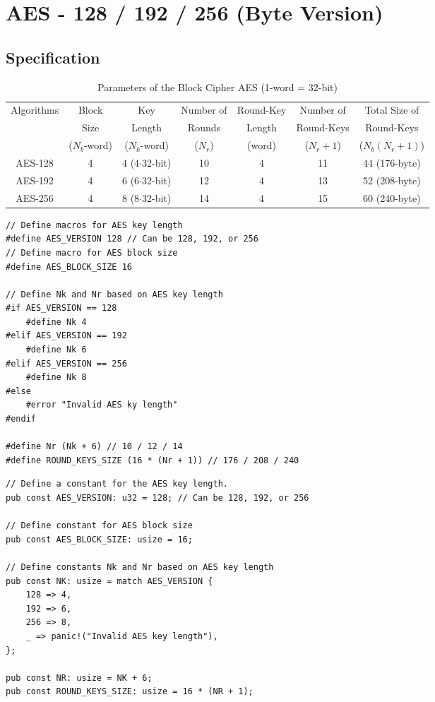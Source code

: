 \chapter{AES - 128 / 192 / 256 (Byte Version)}

\section{Specification}

\begin{table}[h!]\centering\renewcommand{\arraystretch}{1.25} %
	\caption{Parameters of the Block Cipher AES (1-word = 32-bit)}
	\begin{tabular*}{\textwidth}{@{\extracolsep{\fill}}c||cccccc}
		\toprule[1.2pt]
		\multirow{3}{*}{Algorithms} & Block & Key & Number of & Round-Key & Number of & Total Size of\\
		& Size & Length & Rounds &  Length & Round-Keys & Round-Keys \\
		& ($N_b$-word) & ($N_k$-word) & ($N_r$)& (word) & ($N_r+1$)& ($N_b(N_r+1)$)\\
		\hline\hline
		AES-128 & 4 & 4 (4$\cdot$32-bit) & 10 & 4 & 11 & 44 (176-byte) \\
		AES-192 & 4 & 6 (6$\cdot$32-bit) & 12 & 4 & 13 & 52 (208-byte) \\
		AES-256 & 4 & 8 (8$\cdot$32-bit) & 14 & 4 & 15 & 60 (240-byte) \\
		\bottomrule[1.2pt]
	\end{tabular*}
\end{table}

\begin{lstlisting}[style=C, caption={Configuration in C},captionpos=t]
// Define macros for AES key length
#define AES_VERSION 128 // Can be 128, 192, or 256
// Define macro for AES block size
#define AES_BLOCK_SIZE 16

// Define Nk and Nr based on AES key length
#if AES_VERSION == 128
	#define Nk 4
#elif AES_VERSION == 192
	#define Nk 6
#elif AES_VERSION == 256
	#define Nk 8
#else
	#error "Invalid AES ky length"
#endif

#define Nr (Nk + 6) // 10 / 12 / 14
#define ROUND_KEYS_SIZE (16 * (Nr + 1)) // 176 / 208 / 240
\end{lstlisting}
\newpage
\begin{lstlisting}[style=Rust, caption={Configuration in Rust},captionpos=t]
// Define a constant for the AES key length.
pub const AES_VERSION: u32 = 128; // Can be 128, 192, or 256

// Define constant for AES block size
pub const AES_BLOCK_SIZE: usize = 16;

// Define constants Nk and Nr based on AES key length
pub const NK: usize = match AES_VERSION {
	128 => 4,
	192 => 6,
	256 => 8,
	_ => panic!("Invalid AES key length"),
};

pub const NR: usize = NK + 6;
pub const ROUND_KEYS_SIZE: usize = 16 * (NR + 1);
\end{lstlisting}

